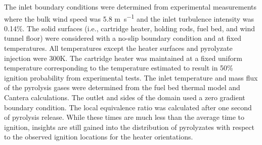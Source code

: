       The inlet boundary conditions were determined from experimental measurements where the bulk wind speed was 5.8 \si{\meter\per\second} and the inlet turbulence intensity was 0.14\%. The solid surfaces (i.e., cartridge heater, holding rods, fuel bed, and wind tunnel floor) were considered with a no-slip boundary condition and at fixed temperatures. All temperatures except the heater surfaces and pyrolyzate injection were 300\si{\kelvin}. The cartridge heater was maintained at a fixed uniform temperature corresponding to the temperature estimated to result in 50\% ignition probability from experimental tests. The inlet temperature and mass flux of the pyrolysis gases were determined from the fuel bed thermal model and Cantera calculations.  The outlet and sides of the domain used a zero gradient boundary condition. The local equivalence ratio was calculated after one second of pyrolysis release. While these times are much less than the average time to ignition, insights are still gained into the distribution of pyrolyzates with respect to the observed ignition locations for the heater orientations. 
    
